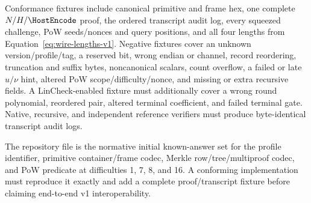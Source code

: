 Conformance fixtures \must{} include canonical primitive and frame hex, one
complete $N/H/\HostEncode$ proof, the ordered transcript audit log, every
squeezed challenge, PoW seeds/nonces and query positions, and all four lengths
from Equation~\eqref{eq:wire-lengths-v1}.  Negative fixtures \must{} cover an
unknown version/profile/tag, a reserved bit, wrong endian or channel, record
reordering, truncation and suffix bytes, noncanonical scalars, count overflow,
a failed or late $u/\nu$ hint, altered PoW scope/difficulty/nonce, and missing
or extra recursive fields.  A LinCheck-enabled fixture must additionally
cover a wrong round polynomial, reordered  pair, altered
terminal coefficient, and failed terminal gate.  Native, recursive, and independent reference
verifiers must produce byte-identical transcript audit logs.

The repository file  is the normative initial
known-answer set for the profile identifier, primitive container/frame codec,
Merkle row/tree/multiproof codec, and PoW predicate at difficulties 1, 7, 8,
and 16.  A conforming implementation must reproduce it exactly and add a
complete proof/transcript
fixture before claiming end-to-end v1 interoperability.

\endgroup
